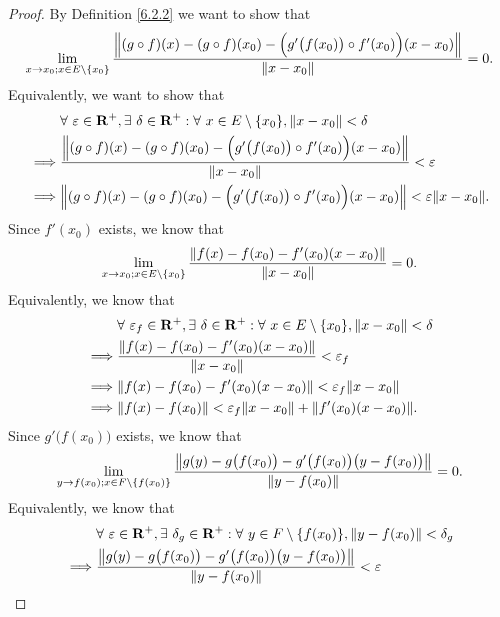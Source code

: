 \begin{proof}
    By Definition \ref{6.2.2} we want to show that
    \[
        \lim_{x \to x_0 ; x \in E \setminus \{x_0\}} \frac{\norm*{(g \circ f)(x) - (g \circ f)(x_0) - \Big(g'\big(f(x_0)\big) \circ f'(x_0)\Big)(x - x_0)}}{\norm*{x - x_0}} = 0.
    \]
    Equivalently, we want to show that
    \begin{align*}
                 & \forall\ \varepsilon \in \mathbf{R}^+, \exists\ \delta \in \mathbf{R}^+ : \forall\ x \in E \setminus \{x_0\}, \norm*{x - x_0} < \delta \\
        \implies & \frac{\norm*{(g \circ f)(x) - (g \circ f)(x_0) - \Big(g'\big(f(x_0)\big) \circ f'(x_0)\Big)(x - x_0)}}{\norm*{x - x_0}} < \varepsilon  \\
        \implies & \norm*{(g \circ f)(x) - (g \circ f)(x_0) - \Big(g'\big(f(x_0)\big) \circ f'(x_0)\Big)(x - x_0)} < \varepsilon \norm*{x - x_0}.
    \end{align*}
    Since \(f'(x_0)\) exists, we know that
    \[
        \lim_{x \to x_0 ; x \in E \setminus \{x_0\}} \frac{\norm*{f(x) - f(x_0) - f'(x_0)(x - x_0)}}{\norm*{x - x_0}} = 0.
    \]
    Equivalently, we know that
    \begin{align*}
                 & \forall\ \varepsilon_f \in \mathbf{R}^+, \exists\ \delta \in \mathbf{R}^+ : \forall\ x \in E \setminus \{x_0\}, \norm*{x - x_0} < \delta \\
        \implies & \frac{\norm*{f(x) - f(x_0) - f'(x_0)(x - x_0)}}{\norm*{x - x_0}} < \varepsilon_f                                                         \\
        \implies & \norm*{f(x) - f(x_0) - f'(x_0)(x - x_0)} < \varepsilon_f \norm*{x - x_0}                                                                 \\
        \implies & \norm*{f(x) - f(x_0)} < \varepsilon_f \norm*{x - x_0} + \norm*{f'(x_0)(x - x_0)}.
    \end{align*}
    Since \(g'\big(f(x_0)\big)\) exists, we know that
    \[
        \lim_{y \to f(x_0) ; x \in F \setminus \{f(x_0)\}} \frac{\norm*{g(y) - g\big(f(x_0)\big) - g'\big(f(x_0)\big)\big(y - f(x_0)\big)}}{\norm*{y - f(x_0)}} = 0.
    \]
    Equivalently, we know that
    \begin{align*}
                 & \forall\ \varepsilon \in \mathbf{R}^+, \exists\ \delta_g \in \mathbf{R}^+ : \forall\ y \in F \setminus \{f(x_0)\}, \norm*{y - f(x_0)} < \delta_g \\
        \implies & \frac{\norm*{g(y) - g\big(f(x_0)\big) - g'\big(f(x_0)\big)\big(y - f(x_0)\big)}}{\norm*{y - f(x_0)}} < \varepsilon                               \\

\end{align*}
\end{proof}
